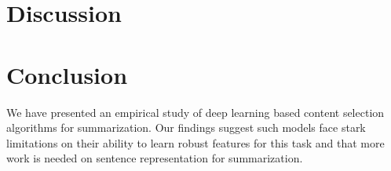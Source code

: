 \documentclass[11pt,a4paper]{article}
\begin{document}
\section{Discussion}



\section{Conclusion}
We have presented an empirical study of deep learning based content selection
algorithms for summarization. Our findings suggest such models face stark limitations on their ability to learn robust features for this task and that 
more work is needed on sentence representation for summarization.






\newpage
\onecolumn
\appendix



\makeappendix
\end{document}
